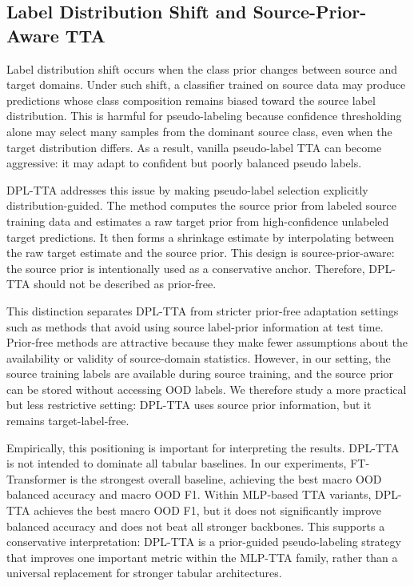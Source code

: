 \subsection{Label Distribution Shift and Source-Prior-Aware TTA}

Label distribution shift occurs when the class prior changes between source and target domains. Under such shift, a classifier trained on source data may produce predictions whose class composition remains biased toward the source label distribution. This is harmful for pseudo-labeling because confidence thresholding alone may select many samples from the dominant source class, even when the target distribution differs. As a result, vanilla pseudo-label TTA can become aggressive: it may adapt to confident but poorly balanced pseudo labels.

DPL-TTA addresses this issue by making pseudo-label selection explicitly distribution-guided. The method computes the source prior from labeled source training data and estimates a raw target prior from high-confidence unlabeled target predictions. It then forms a shrinkage estimate by interpolating between the raw target estimate and the source prior. This design is source-prior-aware: the source prior is intentionally used as a conservative anchor. Therefore, DPL-TTA should not be described as prior-free.

This distinction separates DPL-TTA from stricter prior-free adaptation settings such as methods that avoid using source label-prior information at test time. Prior-free methods are attractive because they make fewer assumptions about the availability or validity of source-domain statistics. However, in our setting, the source training labels are available during source training, and the source prior can be stored without accessing OOD labels. We therefore study a more practical but less restrictive setting: DPL-TTA uses source prior information, but it remains target-label-free.

Empirically, this positioning is important for interpreting the results. DPL-TTA is not intended to dominate all tabular baselines. In our experiments, FT-Transformer is the strongest overall baseline, achieving the best macro OOD balanced accuracy and macro OOD F1. Within MLP-based TTA variants, DPL-TTA achieves the best macro OOD F1, but it does not significantly improve balanced accuracy and does not beat all stronger backbones. This supports a conservative interpretation: DPL-TTA is a prior-guided pseudo-labeling strategy that improves one important metric within the MLP-TTA family, rather than a universal replacement for stronger tabular architectures.

